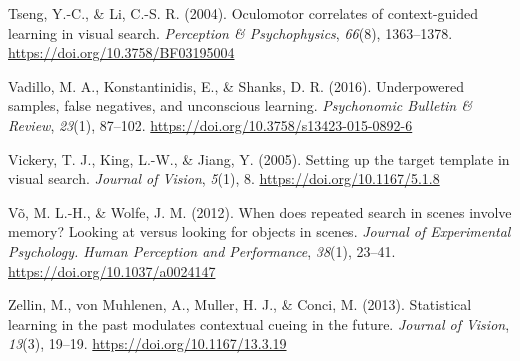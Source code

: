 \documentclass[
  man,
  floatsintext,
  longtable,
  nolmodern,
  notxfonts,
  notimes,
  colorlinks=true,linkcolor=blue,citecolor=blue,urlcolor=blue]{apa7}
\newlength{\cslhangindent}
\newenvironment{CSLReferences}[2] %
 {\begin{list}{}{%
  \setlength{\itemindent}{0pt}
  \setlength{\leftmargin}{0pt}
  \setlength{\parsep}{0pt}
  \ifodd #1
   \setlength{\leftmargin}{\cslhangindent}
   \setlength{\itemindent}{-1\cslhangindent}
  \fi
  \setlength{\itemsep}{#2\baselineskip}}}
 {\end{list}}
\begin{document}
\begin{CSLReferences}{1}{0}
Tseng, Y.-C., \& Li, C.-S. R. (2004). Oculomotor correlates of
context-guided learning in visual search. \emph{Perception \&
Psychophysics}, \emph{66}(8), 1363--1378.
\url{https://doi.org/10.3758/BF03195004}

Vadillo, M. A., Konstantinidis, E., \& Shanks, D. R. (2016).
Underpowered samples, false negatives, and unconscious learning.
\emph{Psychonomic Bulletin \& Review}, \emph{23}(1), 87--102.
\url{https://doi.org/10.3758/s13423-015-0892-6}

Vickery, T. J., King, L.-W., \& Jiang, Y. (2005). Setting up the target
template in visual search. \emph{Journal of Vision}, \emph{5}(1), 8.
\url{https://doi.org/10.1167/5.1.8}

Võ, M. L.-H., \& Wolfe, J. M. (2012). When does repeated search in
scenes involve memory? {Looking} at versus looking for objects in
scenes. \emph{Journal of Experimental Psychology. Human Perception and
Performance}, \emph{38}(1), 23--41.
\url{https://doi.org/10.1037/a0024147}

Zellin, M., von Muhlenen, A., Muller, H. J., \& Conci, M. (2013).
Statistical learning in the past modulates contextual cueing in the
future. \emph{Journal of Vision}, \emph{13}(3), 19--19.
\url{https://doi.org/10.1167/13.3.19}

\end{CSLReferences}
\end{document}
